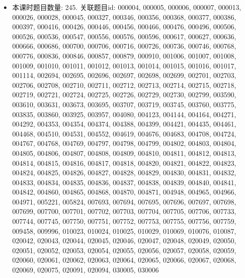 \begin{itemize}
\item 本课时题目数量: 245. 关联题目id: 000004, 000005, 000006, 000007, 000013, 000026, 000028, 000045, 000327, 000346, 000356, 000368, 000377, 000386, 000397, 000416, 000426, 000446, 000456, 000466, 000476, 000496, 000506, 000526, 000536, 000547, 000556, 000576, 000596, 000617, 000627, 000636, 000666, 000686, 000700, 000706, 000716, 000726, 000736, 000746, 000768, 000776, 000836, 000846, 000857, 000879, 000910, 001006, 001007, 001008, 001009, 001010, 001011, 001012, 001013, 001014, 001015, 001016, 001017, 001114, 002694, 002695, 002696, 002697, 002698, 002699, 002701, 002703, 002706, 002708, 002710, 002711, 002712, 002713, 002714, 002715, 002718, 002719, 002721, 002724, 002725, 002726, 002729, 002730, 002799, 003590, 003610, 003631, 003673, 003695, 003707, 003719, 003745, 003760, 003775, 003835, 003860, 003925, 003957, 004080, 004123, 004144, 004164, 004271, 004292, 004353, 004354, 004374, 004388, 004399, 004421, 004435, 004461, 004468, 004510, 004531, 004552, 004619, 004676, 004683, 004708, 004724, 004767, 004768, 004769, 004797, 004798, 004799, 004802, 004803, 004804, 004805, 004806, 004807, 004808, 004809, 004810, 004811, 004812, 004813, 004814, 004815, 004816, 004817, 004818, 004820, 004821, 004822, 004823, 004824, 004825, 004826, 004827, 004828, 004829, 004830, 004831, 004832, 004833, 004834, 004835, 004836, 004837, 004838, 004839, 004840, 004841, 004842, 004860, 004865, 004868, 004870, 004871, 004948, 004965, 004966, 004971, 005221, 005824, 007693, 007694, 007695, 007696, 007697, 007698, 007699, 007700, 007701, 007702, 007703, 007704, 007705, 007706, 007733, 007744, 007745, 007750, 007751, 007752, 007753, 007755, 007756, 007759, 009458, 009996, 010023, 010024, 010025, 010029, 010069, 010076, 010087, 020042, 020043, 020044, 020045, 020046, 020047, 020048, 020049, 020050, 020051, 020052, 020053, 020054, 020055, 020056, 020057, 020058, 020059, 020060, 020061, 020062, 020063, 020064, 020065, 020066, 020067, 020068, 020069, 020075, 020091, 020094, 030005, 030006

\end{itemize}


